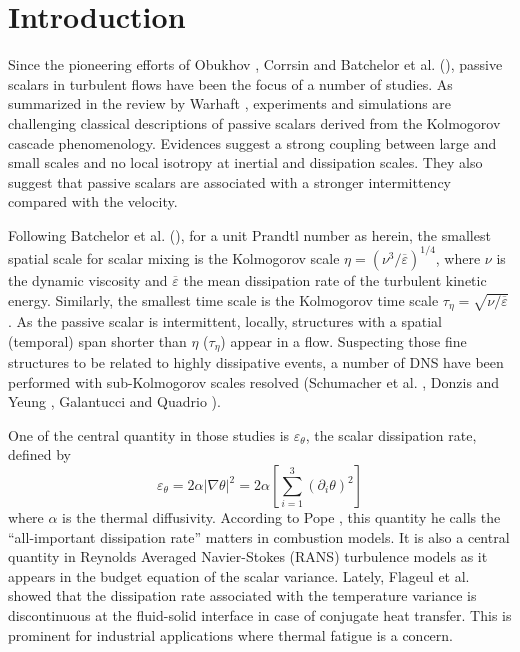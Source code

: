 \documentclass[review]{elsarticle}
\newcommand{\gqcite}{Galantucci and Quadrio \cite{galantucci2010very}}
\newcommand{\epst}{\varepsilon_\theta}
\begin{document}
\linenumbers

\section{Introduction}

Since the pioneering efforts of Obukhov \cite{obukhov1968structure}, Corrsin \cite{corrsin1951spectrum} and Batchelor et al. (\cite{batchelor1959small,batchelor1959small2}), passive scalars in turbulent flows have been the focus of a number of studies. As summarized in the review by Warhaft \cite{warhaft2000passive}, experiments and simulations are challenging classical descriptions of passive scalars derived from the Kolmogorov cascade phenomenology. Evidences suggest a strong coupling between large and small scales and no local isotropy at inertial and dissipation scales. They also suggest that passive scalars are associated with a stronger intermittency compared with the velocity.

Following Batchelor et al. (\cite{batchelor1959small,batchelor1959small2}), for a unit Prandtl number as herein, the smallest spatial scale for scalar mixing is the Kolmogorov scale $\eta = \left( \nu^3 / \overline{\varepsilon} \right)^{1/4}$, where $\nu$ is the dynamic viscosity and $\overline{\varepsilon}$ the mean dissipation rate of the turbulent kinetic energy. Similarly, the smallest time scale is the Kolmogorov time scale $\tau_\eta = \sqrt{\nu / \overline{\varepsilon}}$. As the passive scalar is intermittent, locally, structures with a spatial (temporal) span shorter than $\eta$ ($\tau_\eta$) appear in a flow. Suspecting those fine structures to be related to highly dissipative events, a number of DNS have been performed with sub-Kolmogorov scales resolved (Schumacher et al. \cite{schumacher2005very}, Donzis and Yeung \cite{donzis2010resolution}, \gqcite).

One of the central quantity in those studies is $\epst$, the scalar dissipation rate, defined by 
\begin{equation}
\epst = 2 \alpha \lvert \nabla \theta \rvert^2 = 2 \alpha \left[ \sum_{i=1}^{3} \left( \partial_i \theta \right)^2 \right]
\end{equation}
where $\alpha$ is the thermal diffusivity. According to Pope \cite{pope2013small}, this quantity he calls the “all-important dissipation rate” matters in combustion models. It is also a central quantity in Reynolds Averaged Navier-Stokes (RANS) turbulence models as it appears in the budget equation of the scalar variance. Lately, Flageul et al. \cite{flageul2017discontinuity} showed that the dissipation rate associated with the temperature variance is discontinuous at the fluid-solid interface in case of conjugate heat transfer. This is prominent for industrial applications where thermal fatigue is a concern.
\end{document}
